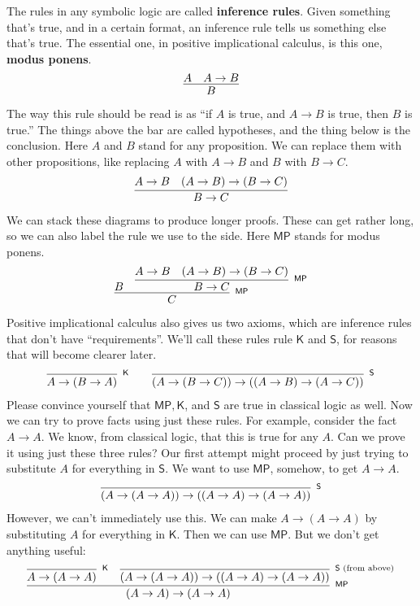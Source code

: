 \documentclass[11pt,paper=letter]{scrartcl}
\newcommand{\sf}{\mathsf}
\begin{document}
The rules in any symbolic logic are called \textbf{inference rules}. Given something that's true, and in a certain format, an inference rule tells us something else that's true. The essential one, in positive implicational calculus, is this one, \textbf{modus ponens}.
\begin{align*}
\infer
{B}
{A & A \to B}
\end{align*}
The way this rule should be read is as ``if $A$ is true, and $A \to B$ is true, then $B$ is true.'' The things above the bar are called hypotheses, and the thing below is the conclusion. Here $A$ and $B$ stand for any proposition. We can replace them with other propositions, like replacing $A$ with $A \to B$ and $B$ with $B \to C$.
\begin{align*}
\infer
{B \to C}
{A \to B & (A \to B) \to (B \to C)}
\end{align*}
We can stack these diagrams to produce longer proofs. These can get rather long, so we can also label the rule we use to the side. Here $\sf{MP}$ stands for modus ponens.
\begin{align*}
\infer[^\sf{MP}]
{C}
{B &
\infer[^\sf{MP}]
{B \to C}
{A \to B & (A \to B) \to (B \to C)}}
\end{align*}
Positive implicational calculus also gives us two axioms, which are inference rules that don't have ``requirements''. We'll call these rules rule $\sf{K}$ and $\sf{S}$, for reasons that will become clearer later.
\begin{align*}
\infer[^\sf{K}]
{A \to (B \to A)}
{}
\qquad
\infer[^\sf{S}]
{(A \to (B \to C)) \to \left((A \to B) \to (A \to C)\right)}
{}
\end{align*}
Please convince yourself that $\sf{MP}, \sf{K}$, and $\sf{S}$ are true in classical logic as well. Now we can try to prove facts using just these rules. For example, consider the fact $A \to A$. We know, from classical logic, that this is true for any $A$. Can we prove it using just these three rules? Our first attempt might proceed by just trying to substitute $A$ for everything in $\sf{S}$. We want to use $\sf{MP}$, somehow, to get $A \to A$.
\begin{align*}
\infer[^\sf{S}]
{(A \to (A \to A)) \to \left((A \to A) \to (A \to A)\right)}
{}
\end{align*}
However, we can't immediately use this. We can make $A \to (A \to A)$ by substituting $A$ for everything in $\sf{K}$. Then we can use $\sf{MP}$. But we don't get anything useful:
\begin{align*}
\infer[^\sf{MP}]
{(A \to A) \to (A \to A)}
{
  \infer[^\sf{K}]
  {A \to (A \to A)}
  {}
  &
  \infer[^{\sf{S}\text{ (from above)}}]
  {(A \to (A \to A)) \to \left((A \to A) \to (A \to A)\right)}
  {}
}
\end{align*}
\end{document}
